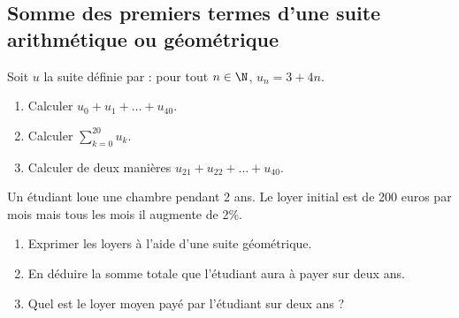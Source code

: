 \documentclass[a4paper,11pt,exos]{nsi} %
\begin{document}
\subsection*{ Somme des premiers termes d'une suite arithmétique ou géométrique}
\exo{}
Soit $u$ la suite définie par : pour tout $n\in\N$, $u_n=3+4n$.
\begin{enumerate}
	\item 	Calculer $u_0+u_1+\ldots+u_{40}$.
	\item 	Calculer $\displaystyle\sum_{k=0}^{20} u_k$.
	\item 	Calculer de deux manières $u_{21}+u_{22}+\ldots+u_{40}$.
\end{enumerate}


\exo{}
Un étudiant loue une chambre pendant 2 ans. Le loyer initial est de 200 euros par mois mais tous les mois il augmente de 2\%.
\begin{enumerate}
	\item 	Exprimer les loyers à l'aide d'une suite géométrique.
	\item 	En déduire la somme totale que l'étudiant aura à payer sur deux ans.
	\item 	Quel est le loyer moyen payé par l'étudiant sur deux ans ?
\end{enumerate}

\setlength{\columnseprule}{0pt}
\end{document}
